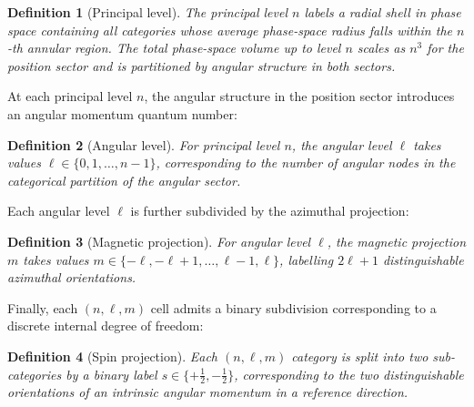 \documentclass[11pt,twocolumn,a4paper]{article}
\newtheorem{definition}{Definition}
\begin{document}
\begin{definition}[Principal level]\label{def:principal}
The principal level $n$ labels a radial shell in phase space containing all categories whose average phase-space radius falls within the $n$-th annular region.
The total phase-space volume up to level $n$ scales as $n^3$ for the position sector and is partitioned by angular structure in both sectors.
\end{definition}

At each principal level $n$, the angular structure in the position sector introduces an angular momentum quantum number:

\begin{definition}[Angular level]\label{def:angular}
For principal level $n$, the angular level $\ell$ takes values $\ell \in \{0, 1, \ldots, n-1\}$, corresponding to the number of angular nodes in the categorical partition of the angular sector.
\end{definition}

Each angular level $\ell$ is further subdivided by the azimuthal projection:

\begin{definition}[Magnetic projection]\label{def:magnetic}
For angular level $\ell$, the magnetic projection $m$ takes values $m \in \{-\ell, -\ell+1, \ldots, \ell-1, \ell\}$, labelling $2\ell + 1$ distinguishable azimuthal orientations.
\end{definition}

Finally, each $(n, \ell, m)$ cell admits a binary subdivision corresponding to a discrete internal degree of freedom:

\begin{definition}[Spin projection]\label{def:spin}
Each $(n, \ell, m)$ category is split into two sub-categories by a binary label $s \in \{+\tfrac{1}{2}, -\tfrac{1}{2}\}$, corresponding to the two distinguishable orientations of an intrinsic angular momentum in a reference direction.
\end{definition}
\end{document}
